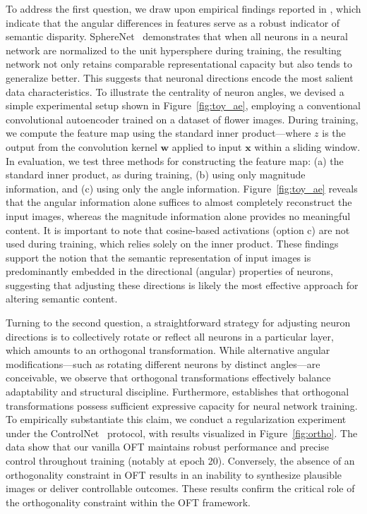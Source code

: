 To address the first question, we draw upon empirical findings reported in \cite{liu2018decoupled,chen2020angular}, which indicate that the angular differences in features serve as a robust indicator of semantic disparity. SphereNet~\cite{liu2017deep} demonstrates that when all neurons in a neural network are normalized to the unit hypersphere during training, the resulting network not only retains comparable representational capacity but also tends to generalize better. This suggests that neuronal directions encode the most salient data characteristics. To illustrate the centrality of neuron angles, we devised a simple experimental setup shown in Figure~\ref{fig:toy_ae}, employing a conventional convolutional autoencoder trained on a dataset of flower images. During training, we compute the feature map using the standard inner product—where $z$ is the output from the convolution kernel $\bm{w}$ applied to input $\bm{x}$ within a sliding window. In evaluation, we test three methods for constructing the feature map: (a) the standard inner product, as during training, (b) using only magnitude information, and (c) using only the angle information. Figure~\ref{fig:toy_ae} reveals that the angular information alone suffices to almost completely reconstruct the input images, whereas the magnitude information alone provides no meaningful content. It is important to note that cosine-based activations (option c) are not used during training, which relies solely on the inner product. These findings support the notion that the semantic representation of input images is predominantly embedded in the directional (angular) properties of neurons, suggesting that adjusting these directions is likely the most effective approach for altering semantic content.

Turning to the second question, a straightforward strategy for adjusting neuron directions is to collectively rotate or reflect all neurons in a particular layer, which amounts to an orthogonal transformation. While alternative angular modifications—such as rotating different neurons by distinct angles—are conceivable, we observe that orthogonal transformations effectively balance adaptability and structural discipline. Furthermore, \cite{liu2021orthogonal} establishes that orthogonal transformations possess sufficient expressive capacity for neural network training. To empirically substantiate this claim, we conduct a regularization experiment under the ControlNet~\cite{zhang2023adding} protocol, with results visualized in Figure~\ref{fig:ortho}. The data show that our vanilla OFT maintains robust performance and precise control throughout training (notably at epoch 20). Conversely, the absence of an orthogonality constraint in OFT results in an inability to synthesize plausible images or deliver controllable outcomes. These results confirm the critical role of the orthogonality constraint within the OFT framework.

